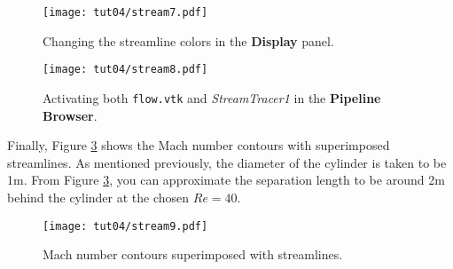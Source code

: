 \begin{figure}[ht]
    \centering
    \texttt{[image: tut04/stream7.pdf]}
    \caption{Changing the streamline colors in the \textbf{Display} panel.}
    \label{fig4:stream7_4}
\end{figure}
\begin{figure}[ht]
    \centering
    \texttt{[image: tut04/stream8.pdf]}
    \caption{Activating both \texttt{flow.vtk} and \textit{StreamTracer1} in the \textbf{Pipeline Browser}.}
    \label{fig4:stream8_4}
\end{figure}
Finally, Figure \ref{fig4:stream9_4} shows the Mach number contours with superimposed streamlines. As mentioned previously, the diameter of the cylinder is taken to be 1m. From Figure \ref{fig4:stream9_4}, you can approximate the separation length to be around 2m behind the cylinder at the chosen $Re=40$.
\begin{figure}[H]
    \centering
    \texttt{[image: tut04/stream9.pdf]}
    \caption{Mach number contours superimposed with streamlines.}
    \label{fig4:stream9_4}
\end{figure}

